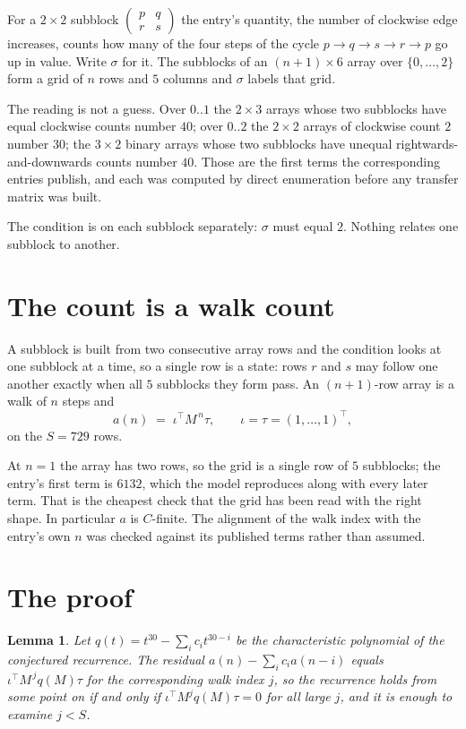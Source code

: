 \documentclass[11pt,a4paper]{article}
\theoremstyle{plain}
\newtheorem{lemma}[theorem]{Lemma}
\theoremstyle{definition}
\begin{document}
For a $2\times2$ subblock $\begin{pmatrix}p&q\\r&s\end{pmatrix}$ the
entry's quantity, the number of clockwise edge increases, counts how many of the four steps of the cycle $p\to q\to s\to r\to p$ go up in value. Write $\sigma$ for it. The subblocks of an
$(n+1)\times6$ array over $\{0,\dots,2\}$ form a grid of $n$ rows and $5$
columns and $\sigma$ labels that grid.

The reading is not a guess. Over $0..1$ the $2\times3$ arrays whose two subblocks have equal
clockwise counts number $40$; over $0..2$ the $2\times2$ arrays of clockwise count $2$ number
$30$; the $3\times2$ binary arrays whose two subblocks have unequal rightwards-and-downwards
counts number $40$. Those are the first terms the corresponding entries publish, and each was
computed by direct enumeration before any transfer matrix was built.

The condition is on each subblock separately: $\sigma$ must equal $2$. Nothing
relates one subblock to another.

\section{The count is a walk count}

A subblock is built from two consecutive array rows and the condition looks
at one subblock at a time, so a single row is a state: rows $r$ and $s$ may follow one another
exactly when all $5$ subblocks they form pass. An $(n+1)$-row array is a walk of $n$ steps and
\[
a(n)\;=\;\iota^{\!\top}M^{\,n}\tau,\qquad\iota=\tau=(1,\dots,1)^{\!\top},
\]
on the $S=729$ rows.

At $n=1$ the array has two rows, so the grid is a single row of $5$
subblocks; the entry's first term is $6132$, which the model
reproduces along with every later term. That is the cheapest check that the grid has been read
with the right shape.
In particular $a$ is $C$-finite. The alignment of the walk index with the entry's own $n$ was
checked against its published terms rather than assumed.

\section{The proof}

\begin{lemma}\label{lem:crit}
Let $q(t)=t^{30}-\sum_i c_it^{30-i}$ be the characteristic polynomial of the
conjectured recurrence. The residual $a(n)-\sum_ic_ia(n-i)$ equals
$\iota^{\!\top}M^{\,j}q(M)\tau$ for the corresponding walk index $j$, so the recurrence
holds from some point on if and only if $\iota^{\!\top}M^{j}q(M)\tau=0$ for all large $j$,
and it is enough to examine $j<S$.
\end{lemma}
\end{document}
